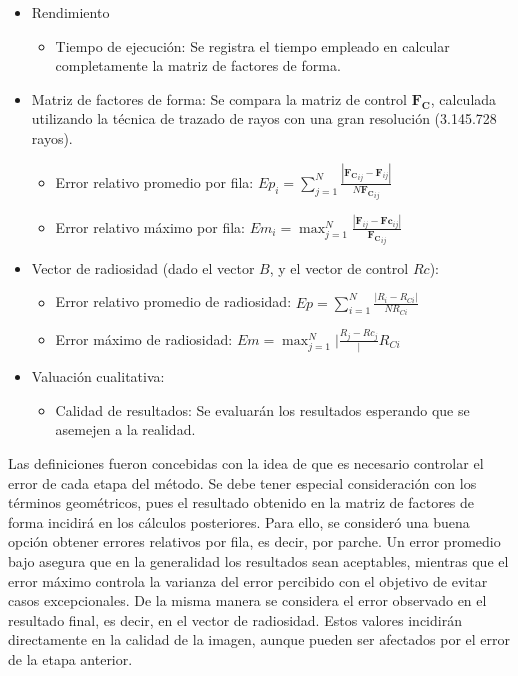 \begin{itemize}
	\item Rendimiento
		\begin{itemize}
			\item Tiempo de ejecución: Se registra el tiempo empleado en calcular completamente la matriz de factores de forma.
		\end{itemize}
	\item Matriz de factores de forma: Se compara la matriz de control $\mathbf{F_{C}}$, calculada utilizando la técnica de trazado de rayos con una gran resolución (3.145.728 rayos).
		\begin{itemize}
			\item Error relativo promedio por fila: $Ep_{i} = \sum_{j=1}^{N} \frac{|\mathbf{F_{C}}_{ij} -\mathbf{F}_{ij}|}{N \mathbf{F_{C}}_{ij}}$
			\item Error relativo máximo por fila: $Em_{i} = \max_{j=1}^{N}\frac{|\mathbf{F}_{ij} -\mathbf{Fc}_{ij}|}{\mathbf{F_{C}}_{ij}}$
		\end{itemize}
	\item Vector de radiosidad (dado el vector $B$, y el vector de control $Rc$):
	\begin{itemize}
		\item Error relativo promedio de radiosidad: $Ep = \sum_{i=1}^{N} \frac{|R_{i}-R_{Ci}|}{N R_{Ci}}$
		\item Error máximo de radiosidad: $Em = \max_{j=1}^{N}|\frac{R_{j} -Rc_{j}}|{R_{Ci}}$
	\end{itemize}
\item Valuación cualitativa:
	\begin{itemize}
		\item Calidad de resultados: Se evaluarán los resultados esperando que se asemejen a la realidad.
	\end{itemize}
\end{itemize}

Las definiciones fueron concebidas con la idea de que es necesario controlar el error de cada etapa del método. Se debe tener especial consideración con los términos geométricos, pues el resultado obtenido en la matriz de factores de forma incidirá en los cálculos posteriores. Para ello, se consideró una buena opción obtener errores relativos por fila, es decir, por parche. Un error promedio bajo asegura que en la generalidad los resultados sean aceptables, mientras que el error máximo controla la varianza del error percibido con el objetivo de evitar casos excepcionales. De la misma manera se considera el error observado en el resultado final, es decir, en el vector de radiosidad. Estos valores incidirán directamente en la calidad de la imagen, aunque pueden ser afectados por el error de la etapa anterior.

